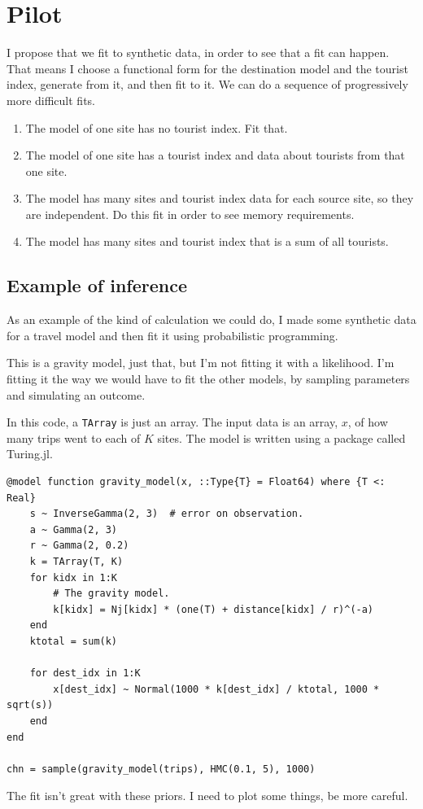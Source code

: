 \documentclass{article}
\begin{document}
\section{Pilot}
I propose that we fit to synthetic data, in order to see that a fit can happen. That means I choose a functional form for the destination model and the tourist index, generate from it, and then fit to it. We can do a sequence of progressively more difficult fits.
\begin{enumerate}
  \item The model of one site has no tourist index. Fit that.
  \item The model of one site has a tourist index and data about tourists from that one site.
  \item The model has many sites and tourist index data for each source site, so they are independent. Do this fit in order to see memory requirements.
  \item The model has many sites and tourist index that is a sum of all tourists.
  \end{enumerate}

\subsection{Example of inference}
As an example of the kind of calculation we could do, I made some synthetic data for a travel model and then fit it using probabilistic programming.

This is a gravity model, just that, but I'm not fitting it with a likelihood. I'm fitting it the way we would have to fit the other models, by sampling parameters and simulating an outcome.

In this code, a \verb|TArray| is just an array. The input data is an array, $x$,  of how many trips went to each of $K$ sites. The model is written using a package called Turing.jl.
\begin{lstlisting}
@model function gravity_model(x, ::Type{T} = Float64) where {T <: Real}
    s ~ InverseGamma(2, 3)  # error on observation.
    a ~ Gamma(2, 3)
    r ~ Gamma(2, 0.2)
    k = TArray(T, K)
    for kidx in 1:K
        # The gravity model.
        k[kidx] = Nj[kidx] * (one(T) + distance[kidx] / r)^(-a)
    end
    ktotal = sum(k)

    for dest_idx in 1:K
        x[dest_idx] ~ Normal(1000 * k[dest_idx] / ktotal, 1000 * sqrt(s))
    end
end

chn = sample(gravity_model(trips), HMC(0.1, 5), 1000)
\end{lstlisting}
The fit isn't great with these priors. I need to plot some things, be more careful.
\end{document}
